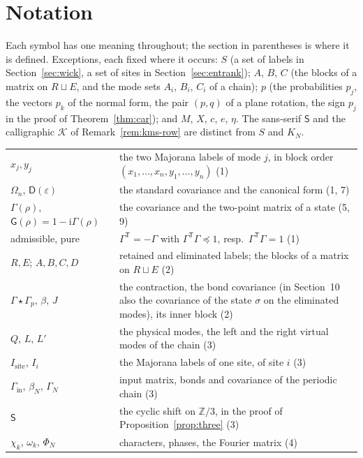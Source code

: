 \documentclass[11pt]{article}
\numberwithin{equation}{section}
\newcommand{\revs}[1]{#1}
\theoremstyle{definition}
\theoremstyle{remark}
\theoremstyle{plain}
\newcommand{\ii}{\mathrm i}
\newcommand{\T}{\mathsf T}
\newcommand{\D}{\mathsf D}
\newcommand{\G}{\mathsf G}
\newcommand{\vet}[1]{#1}
\begin{document}
\clearpage
\section*{Notation}
\noindent Each symbol has one meaning throughout; the section in parentheses is where it is defined.
\vet{Exceptions, each fixed where it occurs: $S$ (a set of labels in Section~\ref{sec:wick}, a set
of sites in Section~\ref{sec:entrank}); $A$, $B$, $C$ (the blocks of a matrix on $R\sqcup E$, and
the mode sets $A_i$, $B_i$, $C_i$ of a chain); $p$ (the probabilities $p_j$, the vectors $p_k$ of
the normal form, the pair $(p,q)$ of a plane rotation, the sign $p_j$ in the proof of
Theorem~\ref{thm:car}); and $M$, $X$, $c$, $e$, $\eta$. The sans-serif $\mathsf S$ and the
calligraphic $\mathcal K$ of Remark~\ref{rem:kms-row} are distinct from $S$ and $K_N$.}
\begin{center}\small
\begin{tabular}{@{}l>{\raggedright\arraybackslash}p{}@{}}
$x_j,y_j$ & the two Majorana labels of mode $j$, in block order $(x_1,\ldots,x_n,y_1,\ldots,y_n)$ (1) \\
$\Omega_n$, $\D(\varepsilon)$ & the standard covariance and the canonical form (1, 7) \\
$\Gamma(\rho)$, $\G(\rho)=1-\ii\Gamma(\rho)$ & the covariance and the two-point matrix of a state (5, 9) \\
admissible, pure & $\Gamma^{\T}=-\Gamma$ with $\Gamma^{\T}\Gamma\preceq1$, resp.\ $\Gamma^{\T}\Gamma=1$ (1) \\
$R,E$; $A,B,C,D$ & retained and eliminated labels; the blocks of a matrix on $R\sqcup E$ (2) \\
$\Gamma\star\Gamma_p$, $\beta$, $J$ & the contraction, the bond covariance \vet{(in Section~10 also the covariance of the state $\sigma$ on the eliminated modes)}, its inner block (2) \\
$Q$, $L$, $L'$ & the physical modes, the left and the right virtual modes of the chain (3) \\
$I_{\mathrm{site}}$, $I_i$ & the Majorana labels of one site, of site $i$ (3) \\
$\Gamma_{\mathrm{in}}$, $\beta_N$, $\Gamma_N$ & input matrix, bonds and covariance of the periodic chain (3) \\
\revs{$\mathsf S$} & \revs{the cyclic shift on $\mathbb Z/3$, in the proof of Proposition~\ref{prop:three} (3)} \\
$\chi_k$, $\omega_k$, $\Phi_N$ & characters, phases, the Fourier matrix (4) \\

\end{tabular}
\end{center}
\end{document}
